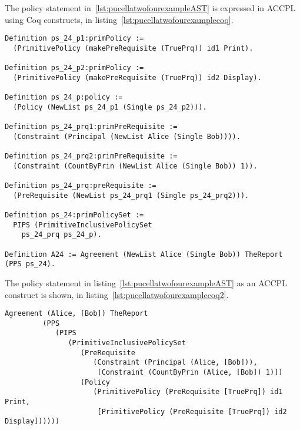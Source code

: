 The policy statement in~\ref{lst:pucellatwofourexampleAST} is expressed in \ac{ACCPL} using Coq constructs, in listing~\ref{lst:pucellatwofourexamplecoq}.

\begin{minipage}[c]{0.95\textwidth}
\begin{lstlisting}
Definition ps_24_p1:primPolicy := 
  (PrimitivePolicy (makePreRequisite (TruePrq)) id1 Print).

Definition ps_24_p2:primPolicy := 
  (PrimitivePolicy (makePreRequisite (TruePrq)) id2 Display).

Definition ps_24_p:policy := 
  (Policy (NewList ps_24_p1 (Single ps_24_p2))).

Definition ps_24_prq1:primPreRequisite := 
  (Constraint (Principal (NewList Alice (Single Bob)))).

Definition ps_24_prq2:primPreRequisite := 
  (Constraint (CountByPrin (NewList Alice (Single Bob)) 1)).
 
Definition ps_24_prq:preRequisite := 
  (PreRequisite (NewList ps_24_prq1 (Single ps_24_prq2))).

Definition ps_24:primPolicySet :=
  PIPS (PrimitiveInclusivePolicySet
    ps_24_prq ps_24_p).

Definition A24 := Agreement (NewList Alice (Single Bob)) TheReport (PPS ps_24).
\end{lstlisting}
\end{minipage} 

The policy statement in listing~\ref{lst:pucellatwofourexampleAST} as an \ac{ACCPL} construct is shown, in listing~\ref{lst:pucellatwofourexamplecoq2}.

\begin{minipage}[c]{0.95\textwidth}
\begin{lstlisting}
Agreement (Alice, [Bob]) TheReport
         (PPS
            (PIPS
               (PrimitiveInclusivePolicySet
                  (PreRequisite
                     (Constraint (Principal (Alice, [Bob])),
                      [Constraint (CountByPrin (Alice, [Bob]) 1)])
                  (Policy
                     (PrimitivePolicy (PreRequisite [TruePrq]) id1 Print,
                      [PrimitivePolicy (PreRequisite [TruePrq]) id2 Display])))))

\end{lstlisting}
\end{minipage} 

